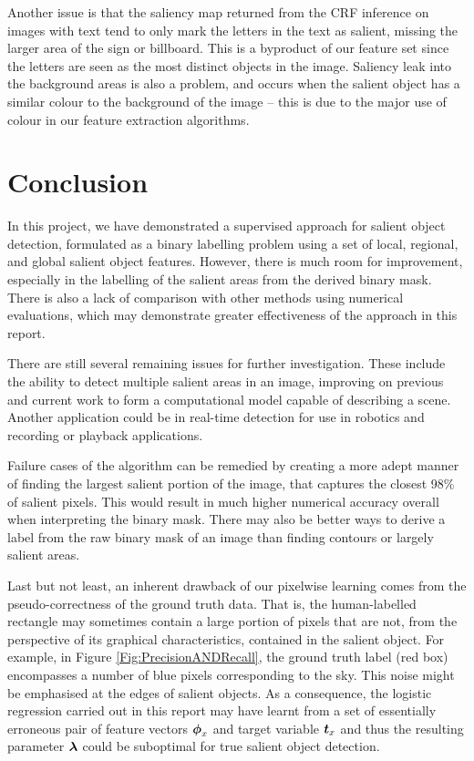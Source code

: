 \documentclass[10pt,twocolumn,letterpaper]{article}
\begin{document}
Another issue is that the saliency map returned from the CRF inference on images with text tend to only mark the letters in the text as salient, missing the larger area of the sign or billboard.  This is a byproduct of our feature set since the letters are seen as the most distinct objects in the image.  Saliency leak into the background areas is also a problem, and occurs when the salient object has a similar colour to the background of the image -- this is due to the major use of colour in our feature extraction algorithms.

\section{Conclusion}

In this project, we have demonstrated a supervised approach for salient object detection, formulated as a binary labelling problem using a set of local, regional, and global salient object features.  However, there is much room for improvement, especially in the labelling of the salient areas from the derived binary mask.  There is also a lack of comparison with other methods using numerical evaluations, which may demonstrate greater effectiveness of the approach in this report.

There are still several remaining issues for further investigation.  These include the ability to detect multiple salient areas in an image, improving on previous and current work to form a computational model capable of describing a scene.  Another application could be in real-time detection for use in robotics and recording or playback applications.

Failure cases of the algorithm can be remedied by creating a more adept manner of finding the largest salient portion of the image, that captures the closest 98\% of salient pixels.  This would result in much higher numerical accuracy overall when interpreting the binary mask.  There may also be better ways to derive a label from the raw binary mask of an image than finding contours or largely salient areas.

Last but not least, an inherent drawback of our pixelwise learning comes from the pseudo-correctness of the ground truth data. That is, the human-labelled rectangle may sometimes contain a large portion of pixels that are not, from the perspective of its graphical characteristics, contained in the salient object. For example, in Figure \ref{Fig:PrecisionANDRecall}, the ground truth label (red box) encompasses a number of blue pixels corresponding to the sky. This noise might be emphasised at the edges of salient objects. As a consequence, the logistic regression carried out in this report may have learnt from a set of essentially erroneous pair of feature vectors $\boldsymbol{\phi}_x$ and target variable $\boldsymbol{t}_x$ and thus the resulting parameter $\boldsymbol{\lambda}$ could be suboptimal for true salient object detection.
\end{document}
